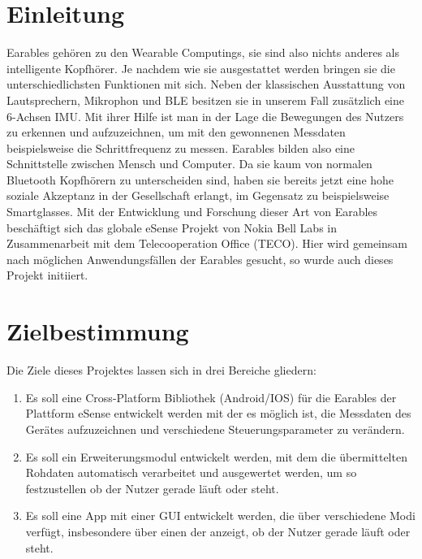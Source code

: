 \documentclass[a4paper,12pt]{article}
\title{\projektName}
\date{\today}
\begin{document}
 \setcounter{page}{2}
 \tableofcontents          %
 \clearpage

\section{Einleitung}
\Gls{Earables} gehören zu den \Gls{Wearable Computings}, sie sind also nichts anderes als intelligente Kopfhörer. Je nachdem wie sie ausgestattet werden bringen sie die unterschiedlichsten Funktionen mit sich. Neben der klassischen Ausstattung von Lautsprechern, Mikrophon und \gls{BLE} besitzen sie in unserem Fall zusätzlich eine \Gls{6-Achsen IMU}. Mit ihrer Hilfe ist man in der Lage die Bewegungen des Nutzers zu erkennen und aufzuzeichnen, um mit den gewonnenen Messdaten  beispielsweise die Schrittfrequenz zu messen.  \Gls{Earables} bilden also eine Schnittstelle zwischen Mensch und Computer. Da sie kaum von normalen Bluetooth Kopfhörern zu unterscheiden sind, haben sie bereits jetzt eine hohe soziale Akzeptanz in der Gesellschaft erlangt, im Gegensatz zu beispielsweise Smartglasses. Mit der Entwicklung und Forschung dieser Art von \Gls{Earables} beschäftigt sich das globale eSense Projekt von Nokia Bell Labs in Zusammenarbeit mit dem Telecooperation Office (TECO). Hier wird gemeinsam nach möglichen Anwendungsfällen der \Gls{Earables} gesucht, so wurde auch dieses Projekt initiiert.
\section{Zielbestimmung}
Die Ziele dieses Projektes lassen sich in drei Bereiche gliedern:
\begin{enumerate}

  \item Es soll eine \Gls{Cross-Platform Bibliothek} (Android/IOS) für die \Gls{Earables} der Plattform eSense entwickelt werden mit der es möglich ist, die Messdaten des Gerätes aufzuzeichnen und verschiedene \Gls{Steuerungsparameter} zu verändern.
  
  \item Es soll ein Erweiterungsmodul entwickelt werden, mit dem die übermittelten  \Gls{Rohdaten} automatisch verarbeitet und ausgewertet werden, um so festzustellen ob der Nutzer gerade läuft oder steht.
  
  \item Es soll eine App mit einer \Gls{GUI} entwickelt werden, die über verschiedene Modi verfügt, insbesondere über einen der anzeigt, ob der Nutzer gerade läuft oder steht. 

\end{enumerate}
\end{document}
